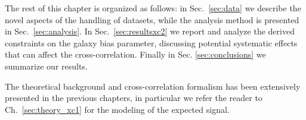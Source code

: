 The rest of this chapter is organized as follows: in Sec.~\eqref{sec:data}
we describe the novel aspects of the handling of datasets, while the analysis method is presented in Sec.~\eqref{sec:analysis}. In Sec.~\eqref{sec:resultsxc2} we report and
analyze the derived constraints on the galaxy bias parameter, discussing potential systematic effects that can affect the cross-correlation. Finally in Sec. \eqref{sec:conclusions} we summarize our results.

 
The theoretical background and cross-correlation formalism has been extensively presented in the previous chapters, in particular we refer the reader to Ch.~\eqref{sec:theory_xc1} for the  modeling of the expected signal.

